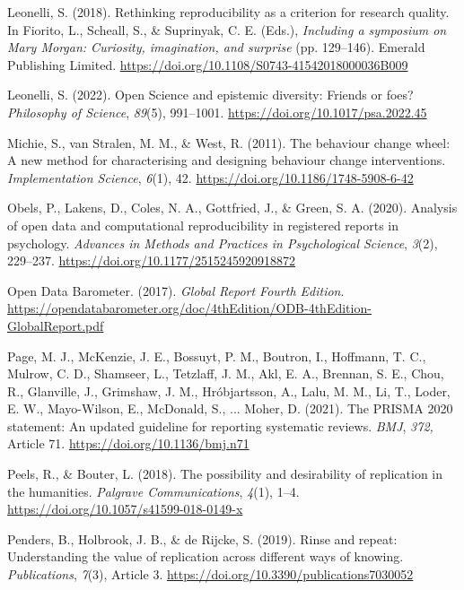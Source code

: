 \documentclass[authordate, meta]{jote-new-article}
\begin{document}
	Leonelli, S. (2018). Rethinking reproducibility as a criterion for research quality. In Fiorito, L., Scheall, S., \& Suprinyak, C. E. (Eds.), \emph{Including a symposium on Mary Morgan: Curiosity, imagination, and surprise} (pp. 129--146). Emerald Publishing Limited. \url{https://doi.org/10.1108/S0743-41542018000036B009}



	Leonelli, S. (2022). Open Science and epistemic diversity: Friends or foes? \emph{Philosophy of Science}, \emph{89}(5), 991--1001. \url{https://doi.org/10.1017/psa.2022.45}



	Michie, S., van Stralen, M. M., \& West, R. (2011). The behaviour change wheel: A new method for characterising and designing behaviour change interventions. \emph{Implementation Science}, \emph{6}(1), 42. \url{https://doi.org/10.1186/1748-5908-6-42}



	Obels, P., Lakens, D., Coles, N. A., Gottfried, J., \& Green, S. A. (2020). Analysis of open data and computational reproducibility in registered reports in psychology. \emph{Advances in Methods and Practices in Psychological Science}, \emph{3}(2), 229--237. \url{https://doi.org/10.1177/2515245920918872}



	Open Data Barometer. (2017). \emph{Global Report Fourth Edition}. \url{https://opendatabarometer.org/doc/4thEdition/ODB-4thEdition-GlobalReport.pdf}



	Page, M. J., McKenzie, J. E., Bossuyt, P. M., Boutron, I., Hoffmann, T. C., Mulrow, C. D., Shamseer, L., Tetzlaff, J. M., Akl, E. A., Brennan, S. E., Chou, R., Glanville, J., Grimshaw, J. M., Hróbjartsson, A., Lalu, M. M., Li, T., Loder, E. W., Mayo-Wilson, E., McDonald, S., ... Moher, D. (2021). The PRISMA 2020 statement: An updated guideline for reporting systematic reviews. \emph{BMJ}, \emph{372, }Article 71. \url{https://doi.org/10.1136/bmj.n71}



	Peels, R., \& Bouter, L. (2018). The possibility and desirability of replication in the humanities. \emph{Palgrave Communications}, \emph{4}(1), 1--4. \url{https://doi.org/10.1057/s41599-018-0149-x}



	Penders, B., Holbrook, J. B., \& de Rijcke, S. (2019). Rinse and repeat: Understanding the value of replication across different ways of knowing. \emph{Publications}, \emph{7}(3), Article 3. \url{https://doi.org/10.3390/publications7030052}
\end{document}
